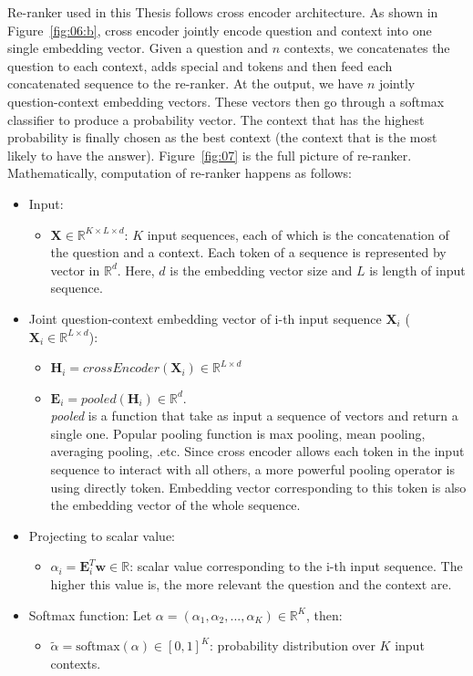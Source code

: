 \documentclass[12pt, sort&compress]{report}
\begin{document}
\par Re-ranker used in this Thesis follows cross encoder architecture. As shown in Figure~\ref{fig:06:b}, cross encoder jointly encode question and context into one single embedding vector. Given a question and $n$ contexts, we concatenates the question to each context, adds special {\sffamily [CLS]} and {\sffamily [SEP]} tokens and then feed each concatenated sequence to the re-ranker. At the output, we have $n$ jointly question-context embedding vectors. These vectors then go through a softmax classifier to produce a probability vector. The context that has the highest probability is finally chosen as the best context (the context that is the most likely to have the answer). Figure~\ref{fig:07} is the full picture of re-ranker. Mathematically, computation of re-ranker happens as follows:
\begin{itemize}
	\item Input:
	\begin{itemize}
		\item $\mathbf{X} \in \mathbb{R}^{K \times L \times d}$: $K$ input sequences, each of which is the concatenation of the question and a context. Each token of a sequence is represented by vector in $\mathbb{R}^d$. Here, $d$ is the embedding vector size and $L$ is length of input sequence.
	\end{itemize}
	\item Joint question-context embedding vector of i-th input sequence $\mathbf{X}_i$ ($\mathbf{X}_i \in \mathbb{R}^{L \times d}$):
	\begin{itemize}
		\item $\mathbf{H}_i = crossEncoder\left(\mathbf{X}_i\right) \in \mathbb{R}^{L \times d}$
		\item $\mathbf{E}_i = pooled\left(\mathbf{H}_i\right) \in \mathbb{R}^d$. \\\textit{pooled} is a function that take as input a sequence of vectors and return a single one. Popular pooling function is max pooling, mean pooling, averaging pooling, .etc. Since cross encoder allows each token in the input sequence to interact with all others, a more powerful pooling operator is using directly {\sf [CLS]} token. Embedding vector corresponding to this token is also the embedding vector of the whole sequence.
	\end{itemize}
	\item Projecting to scalar value:
	\begin{itemize}
		\item $\alpha_i = \mathbf{E}_i^T\mathbf{w} \in \mathbb{R}$: scalar value corresponding to the i-th input sequence. The higher this value is, the more relevant the question and the context are.
	\end{itemize}
	\item Softmax function: Let $\alpha = \left(\alpha_1, \alpha_2, ..., \alpha_K\right) \in \mathbb{R}^K$, then:
	\begin{itemize}
		\item $\tilde{\alpha} = \text{softmax}\left(\alpha\right) \in [0, 1]^K$: probability distribution over $K$ input contexts.
	\end{itemize}
\end{itemize}
\end{document}
